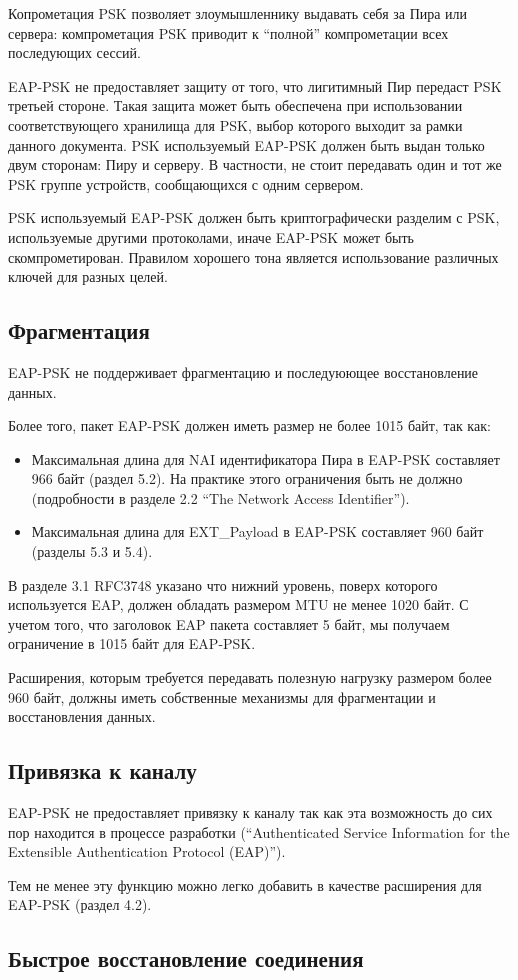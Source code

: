 Копрометация PSK позволяет злоумышленнику выдавать себя за Пира или сервера: компрометация PSK приводит к ``полной'' компрометации всех последующих сессий.

EAP-PSK не предоставляет защиту от того, что лигитимный Пир передаст PSK третьей стороне. Такая защита может быть обеспечена при использовании соответствующего хранилища для PSK, выбор которого выходит за рамки данного документа. PSK используемый EAP-PSK должен быть выдан только двум сторонам: Пиру и серверу. В частности, не стоит передавать один и тот же PSK группе устройств, сообщающихся с одним сервером.

PSK используемый EAP-PSK должен быть криптографически разделим с PSK, используемые другими протоколами, иначе EAP-PSK может быть скомпрометирован. Правилом хорошего тона является использование различных ключей для разных целей.

\subsection{Фрагментация}

EAP-PSK не поддерживает фрагментацию и последуюющее восстановление данных.

Более того, пакет EAP-PSK должен иметь размер не более 1015 байт, так как:

\begin{itemize}
\item Максимальная длина для NAI идентификатора Пира в EAP-PSK составляет 966 байт (раздел 5.2). На практике этого ограничения быть не должно (подробности в разделе 2.2 ``The Network Access Identifier'').
\item Максимальная длина для EXT\_Payload в EAP-PSK составляет 960 байт (разделы 5.3 и 5.4).
\end{itemize}

В разделе 3.1 RFC3748 указано что нижний уровень, поверх которого используется EAP, должен обладать размером MTU не менее 1020 байт. С учетом того, что заголовок EAP пакета составляет 5 байт, мы получаем ограничение в 1015 байт для EAP-PSK.

Расширения, которым требуется передавать полезную нагрузку размером более 960 байт, должны иметь собственные механизмы для фрагментации и восстановления данных.

\subsection{Привязка к каналу}

EAP-PSK не предоставляет привязку к каналу так как эта возможность до сих пор находится в процессе разработки (``Authenticated Service Information for the Extensible Authentication Protocol (EAP)'').

Тем не менее эту функцию можно легко добавить в качестве расширения для EAP-PSK (раздел 4.2).

\subsection{Быстрое восстановление соединения}
